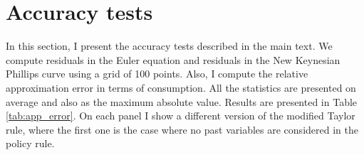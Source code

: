 \documentclass[12pt]{article}
\numberwithin{equation}{section}
\begin{document}
\section{Accuracy tests}\label{app:accuracy}
	
In this section, I present the accuracy tests described in the main text. We compute residuals in the Euler equation and residuals in the New Keynesian Phillips curve using a grid of 100 points. Also, I compute the relative approximation error in terms of consumption. All the statistics are presented on average and also as the maximum absolute value. Results are presented in Table \ref{tab:app_error}. On each panel I show a different version of the modified Taylor rule, where the first one is the case where no past variables are considered in the policy rule.


	
\end{document}
